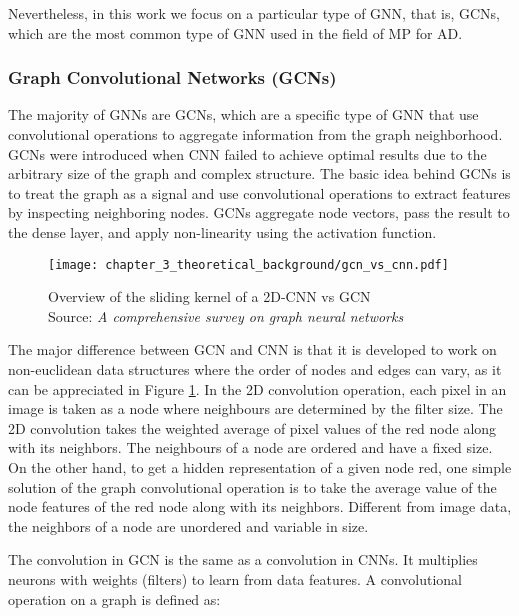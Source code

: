 Nevertheless, in this work we focus on a particular type of \ac{GNN}, that is, \acfp{GCN}, which are the most common type of \ac{GNN} used in the field of \ac{MP} for \ac{AD}.

\subsubsection{Graph Convolutional Networks (GCNs)}
\label{subsubsec:3_gcns}

The majority of \acp{GNN} are \acfp{GCN}, which are a specific type of \ac{GNN} that use convolutional operations to aggregate information from the graph neighborhood. \acp{GCN} were introduced when \ac{CNN} failed to achieve optimal results due to the arbitrary size of the graph and complex structure. The basic idea behind \acp{GCN} is to treat the graph as a signal and use convolutional operations to extract features by inspecting neighboring nodes. \acp{GCN} aggregate node vectors, pass the result to the dense layer, and apply non-linearity using the activation function. 

\begin{figure}[h]
	\centering
	\texttt{[image: chapter\_3\_theoretical\_background/gcn\_vs\_cnn.pdf]}
	\caption[Overview of the sliding kernel of a 2D-CNN vs GCN]{Overview of the sliding kernel of a 2D-CNN vs GCN \\ 
	Source: \textit{A comprehensive survey on graph neural networks} \cite{wu2020comprehensive}}
	\label{fig:chapter_3_theoretical_background/gcn_vs_cnn}
\end{figure}

The major difference between \ac{GCN} and \ac{CNN} is that it is developed to work on non-euclidean data structures where the order of nodes and edges can vary, as it can be appreciated in Figure \ref{fig:chapter_3_theoretical_background/gcn_vs_cnn}. In the 2D convolution operation, each pixel in an image is taken as a node where neighbours are determined by the filter size. The 2D convolution takes the weighted average of pixel values of the red node along with its neighbors. The neighbours of a node are ordered and have a fixed size. On the other hand, to get a hidden representation of a given node red, one simple solution of the graph convolutional operation is to take the average value of the node features of the red node along with its neighbors. Different from image data, the neighbors of a node are unordered and variable in size.

The convolution in GCN is the same as a convolution in \acp{CNN}. It multiplies neurons with weights (filters) to learn from data features. A convolutional operation on a graph is defined as:


